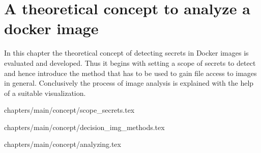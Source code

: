 \chapter{A theoretical concept to analyze a docker image}
\label{ch:theory}
In this chapter the theoretical concept of detecting secrets in Docker images is evaluated and developed. 
Thus it begins with setting a scope of secrets to detect and hence introduce the method that has to be used to gain file access to images in general. 
Conclusively the process of image analysis is explained with the help of a suitable visualization.

 {chapters/main/concept/scope_secrets.tex}

 {chapters/main/concept/decision_img_methods.tex}

 {chapters/main/concept/analyzing.tex}
